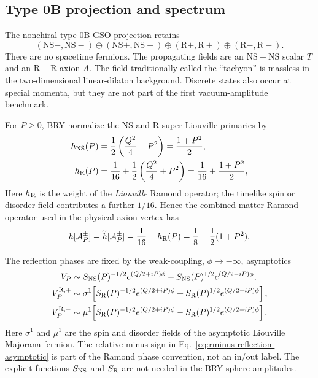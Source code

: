 \documentclass[11pt]{article}
\newcommand{\NSNS}{\mathrm{NS\!\!-\!\!NS}}
\newcommand{\RR}{\mathrm{R\!\!-\!\!R}}
\begin{document}
\subsection{Type 0B projection and spectrum}

The nonchiral type 0B GSO projection retains
\begin{equation}
 (\mathrm{NS}-,\mathrm{NS}-)
 \oplus(\mathrm{NS}+,\mathrm{NS}+)
 \oplus(\mathrm{R}+,\mathrm{R}+)
 \oplus(\mathrm{R}-,\mathrm{R}-).
 \label{eq:gso}
\end{equation}
There are no spacetime fermions.  The propagating fields are an $\NSNS$
scalar $T$ and an $\RR$ axion $A$.  The field traditionally called the
``tachyon'' is massless in the two-dimensional linear-dilaton background.
Discrete states also occur at special momenta, but they are not part of the
first vacuum-amplitude benchmark.

For $P\ge0$, BRY normalize the NS and R super-Liouville primaries by
\begin{align}
 h_{\rm NS}(P)&=\frac12\left(\frac{Q^2}{4}+P^2\right)
               =\frac{1+P^2}{2},\notag\\
 h_{\rm R}(P)&=\frac1{16}
 +\frac12\left(\frac{Q^2}{4}+P^2\right)
 =\frac1{16}+\frac{1+P^2}{2},
 \label{eq:liouville-weights}
\end{align}
Here $h_{\rm R}$ is the weight of the \emph{Liouville} Ramond operator;
the timelike spin or disorder field contributes a further $1/16$.  Hence
the combined matter Ramond operator used in the physical axion vertex has
\begin{equation}
 h[\mathcal A_P^\pm]=\widetilde h[\mathcal A_P^\pm]
 =\frac1{16}+h_{\rm R}(P)
 =\frac18+\frac12(1+P^2).
 \label{eq:combined-ramond-weight}
\end{equation}

The reflection phases are fixed by the weak-coupling, $\phi\to-\infty$,
asymptotics
\begin{align}
 V_P&\sim S_{\rm NS}(P)^{-1/2}e^{(Q/2+iP)\phi}
       +S_{\rm NS}(P)^{1/2}e^{(Q/2-iP)\phi},
 \label{eq:ns-reflection-asymptotic}\\
 V_P^{\mathrm R,+}&\sim\sigma^1\!\left[
 S_{\rm R}(P)^{-1/2}e^{(Q/2+iP)\phi}
 +S_{\rm R}(P)^{1/2}e^{(Q/2-iP)\phi}\right],
 \label{eq:rplus-reflection-asymptotic}\\
 V_P^{\mathrm R,-}&\sim\mu^1\!\left[
 S_{\rm R}(P)^{-1/2}e^{(Q/2+iP)\phi}
 -S_{\rm R}(P)^{1/2}e^{(Q/2-iP)\phi}\right].
 \label{eq:rminus-reflection-asymptotic}
\end{align}
Here $\sigma^1$ and $\mu^1$ are the spin and disorder fields of the
asymptotic Liouville Majorana fermion.  The relative minus sign in
Eq.~\eqref{eq:rminus-reflection-asymptotic} is part of the Ramond phase
convention, not an in/out label.  The explicit functions $S_{\rm NS}$ and
$S_{\rm R}$ are not needed in the BRY sphere amplitudes.
\end{document}
